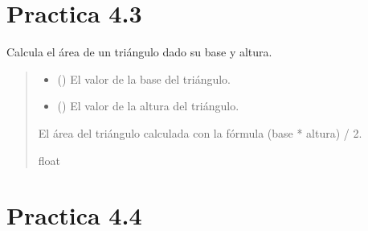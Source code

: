 \documentclass[letterpaper,10pt,spanish]{sphinxmanual}
\begin{document}
\section{Practica 4.3}
\label{\detokenize{pr4:module-pr4.3}}\label{\detokenize{pr4:practica-4-3}}

\begin{fulllineitems}
\label{\detokenize{pr4:pr4.3.calcular_area_triangulo}}
\pysigstartsignatures
{}
\pysigstopsignatures
\sphinxAtStartPar
Calcula el área de un triángulo dado su base y altura.
\begin{quote}\begin{description}
\begin{itemize}
\item {} 
\sphinxAtStartPar
{} () \textendash{} El valor de la base del triángulo.

\item {} 
\sphinxAtStartPar
{} () \textendash{} El valor de la altura del triángulo.

\end{itemize}

\sphinxAtStartPar
El área del triángulo calculada con la fórmula (base * altura) / 2.

\sphinxAtStartPar
float

\end{description}\end{quote}

\end{fulllineitems}



\section{Practica 4.4}
\label{\detokenize{pr4:module-pr4.4}}\label{\detokenize{pr4:practica-4-4}}
\end{document}
